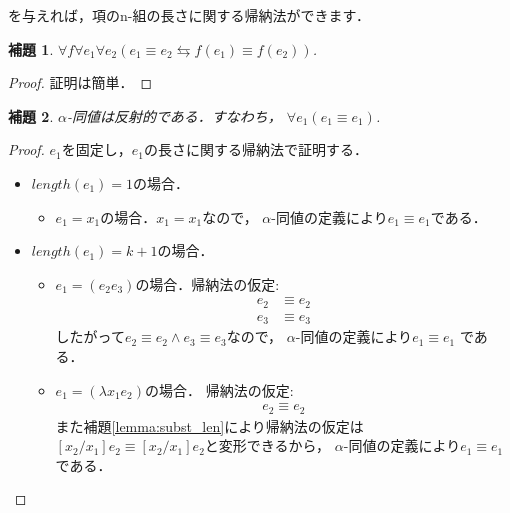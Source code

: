 \documentclass{ltjsbook}%
\newtheorem{lemma}{補題}[section]%
\newcommand\lemmaname{補題}%
\begin{document}
を与えれば，項のn-組の長さに関する帰納法ができます．%
\begin{lemma}%
  \label{lemma:alpha_fequal}%
  $\forall\mathit{f}\forall\mathit{e}_1\forall\mathit{e}_2%
  (\mathit{e}_1\equiv\mathit{e}_2\leftrightarrows%
  \mathit{f}(\mathit{e}_1)\equiv\mathit{f}(\mathit{e}_2))$.%
\end{lemma}%
\begin{proof}%
  証明は簡単．%
\end{proof}%
\begin{lemma}%
  $\alpha$-同値は反射的である．すなわち，%
  $\forall\mathit{e}_1(\mathit{e}_1\equiv\mathit{e}_1)$.%
\end{lemma}%
\begin{proof}%
  $\mathit{e}_1を固定し$，$\mathit{e}_1$の長さに関する帰納法で証明する．%
  \begin{itemize}%
  \item $length(\mathit{e}_1)=1$の場合．%
  \begin{itemize}%
  \item $\mathit{e}_1=\mathit{x}_1$の場合．$\mathit{x}_1=\mathit{x}_1$なので，%
    $\alpha$-同値の定義により$\mathit{e}_1\equiv\mathit{e}_1$である．%
  \end{itemize}%
  \item $length(\mathit{e}_1)=k + 1$の場合．%
  \begin{itemize}%
  \item $\mathit{e}_1=(\mathit{e}_2\mathit{e}_3)$の場合．帰納法の仮定:%
    \begin{align}%
      \mathit{e}_2&\equiv \mathit{e}_2\\%
      \mathit{e}_3&\equiv \mathit{e}_3%
    \end{align}%
    したがって$\mathit{e}_2\equiv \mathit{e}_2%
    \land \mathit{e}_3\equiv \mathit{e}_3$なので，%
    $\alpha$-同値の定義により$\mathit{e}_1\equiv \mathit{e}_1$%
    である．%
  \item $\mathit{e}_1=(\lambda \mathit{x}_1\mathit{e}_2)$の場合．%
    帰納法の仮定:%
    \begin{align}%
      \mathit{e}_2\equiv\mathit{e}_2%
    \end{align}%
    また\lemmaname\ref{lemma:subst_len}により帰納法の仮定は%
    $[\mathit{x}_2/\mathit{x}_1]\mathit{e}_2\equiv%
    [\mathit{x}_2/\mathit{x}_1]\mathit{e}_2$と変形できるから，%
    $\alpha$-同値の定義により$\mathit{e}_1\equiv \mathit{e}_1$である．%
  \end{itemize}%
  \end{itemize}%
\end{proof}%
\end{document}
